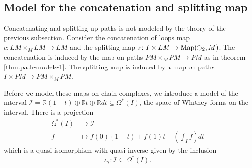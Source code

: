 \documentclass{scrartcl}
\theoremstyle{plain}
\theoremstyle{definition}
\newtheorem{remark}[theorem]{Remark}
\newcommand{\R}{\mathbb R}
\newcommand{\Z}{\mathbb Z}
\renewcommand{\subset}{\subseteq}
\DeclareMathOperator{\Map}{Map}
\begin{document}
\subsection{Model for the concatenation and splitting map}\label{subsec:model-concatenation} 
Concatenating and splitting up paths is not modeled by the theory of the previous subsection. Consider the concatenation of loops map $c\colon LM\times_M LM\to LM$ and the splitting map $s\colon I\times LM\to \Map(\ocircle_2, M)$. The concatenation is induced by the map on paths $PM\times_M PM \to PM$ as in theorem \ref{thm:path-models-1}. The splitting map is induced by a map on paths $I\times PM \to PM\times_M PM$.


Before we model these maps on chain complexes, we introduce a model of the interval $\mathcal I = \R (1-t) \oplus \R t \oplus \R dt\subset \Omega^*(I)$, the space of Whitney forms on the interval. There is a projection 
\begin{align*}
    \Omega^*(I) &\to \mathcal I\\
    f&\mapsto f(0)(1-t) + f(1) t + \left(\int_I f\right) dt
\end{align*}
which is a quasi-isomorphism with quasi-inverse given by the inclusion $$\iota_{\mathcal I}\colon \mathcal I \subset \Omega^*(I).$$ 
\end{document}
